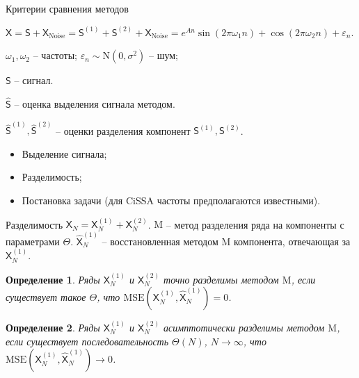 \documentclass[notheorems, handout]{beamer}
\newtheorem{definition}{Определение}
\newcommand{\TS}{\mathsf{X}}
\begin{document}
	\begin{frame}{Критерии сравнения методов}

		\textbf{} 

		$\TS = \mathsf{S} + \TS_{\mathrm{Noise}}=
		\mathsf{S}^{(1)} + \mathsf{S}^{(2)} + \TS_{\mathrm{Noise}}= 
		e^{A{n}}
		\sin\left({2\pi\omega_1 n}\right) + 
		\cos\left({2\pi\omega_2 n}\right) + \varepsilon_n$.

		$\omega_1, \omega_2$ -- частоты;
		$\varepsilon_n \sim \mathrm N(0, \sigma^2)$ -- шум; 

		$\mathsf{S}$ -- сигнал.

		$\hat{\mathsf{S}}$ -- оценка выделения сигнала методом.

		$\hat{\mathsf{S}}^{(1)}, 
		\hat{\mathsf{S}}^{(2)}$ -- оценки разделения компонент $\mathsf{S}^{(1)}, \mathsf{S}^{(2)}$.

		\bigskip

		\textbf{}
		\begin{itemize}
			\item Выделение сигнала;
			\item Разделимость;
			\item Постановка задачи (для CiSSA частоты предполагаются известными).
		\end{itemize}
		
	\end{frame}


	\begin{frame}{Разделимость}
		\( \TS_N = \TS^{(1)}_N + \TS^{(2)}_N \). 
		$\mathrm M$ -- метод разделения ряда на компоненты с параметрами $\Theta$.
		$\hat{\TS}_N^{(1)}$ -- восстановленная методом $\mathrm M$ компонента, отвечающая за $\TS_N^{(1)}$. 
		\begin{definition}
			\label{def:exact}
			Ряды \( \TS^{(1)}_N \) и \( \TS^{(2)}_N \) точно разделимы методом $\mathrm M$, если существует такое \( {\Theta} \), что \( \mathrm{MSE}\left(\TS^{(1)}_N, \hat{\TS}^{(1)}_N\right) = 0 \).
		\end{definition}

		\begin{definition}
			\label{def:asymp}
			Ряды \( \TS^{(1)}_N \) и \( \TS^{(2)}_N \) асимптотически разделимы методом $\mathrm M$, если существует последовательность \( {\Theta}(N)\), \( N \rightarrow \infty \), что \( \mathrm{MSE}\left(\TS^{(1)}_N, \hat{\TS}^{(1)}_N\right) \rightarrow 0 \).
		\end{definition}

	\end{frame}
	
\end{document}
